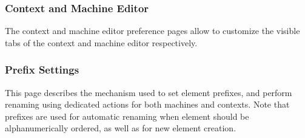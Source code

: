 \subsubsection{Context and Machine Editor}

The context and machine editor preference pages allow to customize the visible tabs of the context and machine editor respectively.

\subsubsection{Prefix Settings}

This page describes the mechanism used to set element prefixes, and perform renaming using dedicated actions for both machines and contexts. Note that prefixes are used for automatic renaming when element should be alphanumerically ordered, as well as for new element creation. 





